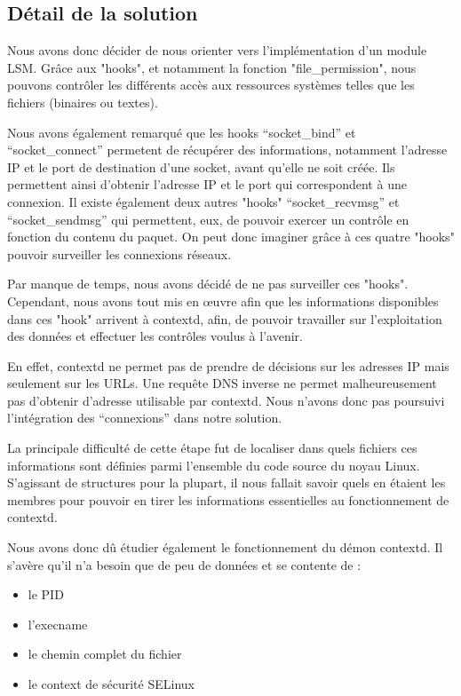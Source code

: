 \documentclass[pdftex,a4paper,titlepage,11pt]{article}
\begin{document}
\subsection{Détail de la solution}

Nous avons donc décider de nous orienter vers l'implémentation d'un module LSM. Grâce aux "hooks", et notamment la fonction "file\_permission", nous pouvons contrôler les différents accès aux ressources systèmes telles que les fichiers (binaires ou textes).

Nous avons également remarqué que les hooks ``socket\_bind'' et ``socket\_connect'' permetent de récupérer des informations, notamment l'adresse IP et le port de destination d'une socket, avant qu'elle ne soit créée. Ils permettent ainsi d'obtenir l'adresse IP et le port qui correspondent à une connexion. Il existe également deux autres "hooks" ``socket\_recvmsg'' et ``socket\_sendmsg'' qui permettent, eux, de pouvoir exercer un contrôle en fonction du contenu du paquet. On peut donc imaginer grâce à ces quatre "hooks" pouvoir surveiller les connexions réseaux.

Par manque de temps, nous avons décidé de ne pas surveiller ces "hooks". Cependant, nous avons tout mis en œuvre afin que les informations disponibles dans ces "hook" arrivent à contextd, afin, de pouvoir travailler sur l'exploitation des données et effectuer les contrôles voulus à l'avenir.

En effet, contextd ne permet pas de prendre de décisions sur les adresses IP mais seulement sur les URLs. Une requête DNS inverse ne permet malheureusement pas d'obtenir d'adresse utilisable par contextd. Nous n'avons donc pas poursuivi l'intégration des ``connexions'' dans notre solution.

La principale difficulté de cette étape fut de localiser dans quels fichiers ces informations sont définies parmi l'ensemble du code source du noyau Linux. S'agissant de structures pour la plupart, il nous fallait savoir quels en étaient les membres pour pouvoir en tirer les informations essentielles au fonctionnement de contextd.

Nous avons donc dû étudier également le fonctionnement du démon contextd. Il s'avère qu'il n'a besoin que de peu de données et se contente de :
	\begin{itemize}
		\item le PID
		\item l'execname
		\item le chemin complet du fichier
		\item le context de sécurité SELinux~\\
	\end{itemize}
	
\end{document}
